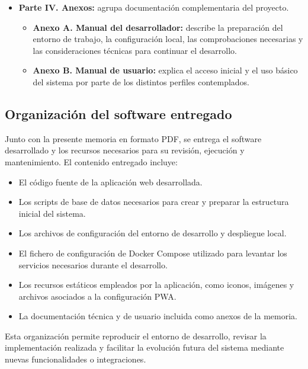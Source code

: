 \begin{itemize}
    \item \textbf{Parte IV. Anexos:} agrupa documentación complementaria del proyecto.
          \begin{itemize}
              \item \textbf{Anexo A. Manual del desarrollador:} describe la preparación del entorno de trabajo, la configuración local, las comprobaciones necesarias y las consideraciones técnicas para continuar el desarrollo.
              \item \textbf{Anexo B. Manual de usuario:} explica el acceso inicial y el uso básico del sistema por parte de los distintos perfiles contemplados.
          \end{itemize}

\end{itemize}

\subsection{Organización del software entregado}

Junto con la presente memoria en formato PDF, se entrega el software desarrollado y los recursos necesarios para su revisión, ejecución y mantenimiento. El contenido entregado incluye:

\begin{itemize}
    \item El código fuente de la aplicación web desarrollada.
    \item Los scripts de base de datos necesarios para crear y preparar la estructura inicial del sistema.
    \item Los archivos de configuración del entorno de desarrollo y despliegue local.
    \item El fichero de configuración de Docker Compose utilizado para levantar los servicios necesarios durante el desarrollo.
    \item Los recursos estáticos empleados por la aplicación, como iconos, imágenes y archivos asociados a la configuración PWA.
    \item La documentación técnica y de usuario incluida como anexos de la memoria.
\end{itemize}

Esta organización permite reproducir el entorno de desarrollo, revisar la implementación realizada y facilitar la evolución futura del sistema mediante nuevas funcionalidades o integraciones.
